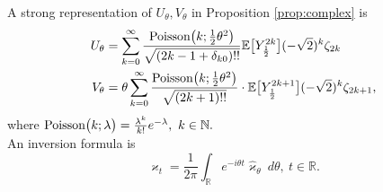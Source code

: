 \documentclass[10pt,a4paper]{amsart}
\begin{document}
\begin{Corollary}
A strong representation of $U_\theta, V_\theta$ in Proposition \ref{prop:complex} is
\begin{align}
U_\theta &= \sum_{k=0}^\infty
\frac{ \text{\rm Poisson}\big (k;\frac{1}{2}\theta^2\big ) 
 }
{ \sqrt{(2k-1+\delta_{k0})!!}  }
\mathbb{E}\big [Y_{\frac{1}{2}}^{2k}\big ](-\sqrt{2})^k  \zeta_{2k}
\nonumber\\
V_\theta &= \theta\sum_{k=0}^\infty
\frac{ \text{\rm Poisson}\big (k;\frac{1}{2}\theta^2\big )   }
{ \sqrt{(2k+1)!! } }
\cdot \mathbb{E}\big [Y_{\frac{1}{2}}^{2k+1}\big ](-\sqrt{2})^k \zeta_{2k+1},
\label{complex:88}
\end{align}
where 
$
\text{\rm Poisson}\big (k;\lambda\big ) = \frac{\lambda^k}{k!}e^{-\lambda},\ k \in \mathbb{N}.
$ \\[0.2cm]
An inversion formula is
\begin{equation}
\varkappa_t = \frac{1}{2\pi}\int_{\mathbb{R}}
e^{-i\theta t}\widehat{\varkappa}_\theta\ d\theta,\ t \in \mathbb{R}.
\label{inversion:23}
\end{equation}
\end{Corollary}
\end{document}
